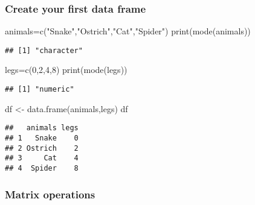 \documentclass[
]{article}
\author{}
\date{\vspace{-2.5em}}
\newenvironment{Shaded}{\begin{snugshade}}{\end{snugshade}}
\newcommand{\DecValTok}[1]{\textcolor[rgb]{0.00,0.00,0.81}{#1}}
\newcommand{\FunctionTok}[1]{\textcolor[rgb]{0.00,0.00,0.00}{#1}}
\newcommand{\NormalTok}[1]{#1}
\newcommand{\OtherTok}[1]{\textcolor[rgb]{0.56,0.35,0.01}{#1}}
\newcommand{\StringTok}[1]{\textcolor[rgb]{0.31,0.60,0.02}{#1}}
\begin{document}
\hypertarget{create-your-first-data-frame}{%
\subsubsection{Create your first data
frame}\label{create-your-first-data-frame}}

\begin{Shaded}
\begin{Highlighting}[]
\NormalTok{animals}\OtherTok{=}\FunctionTok{c}\NormalTok{(}\StringTok{"Snake"}\NormalTok{,}\StringTok{"Ostrich"}\NormalTok{,}\StringTok{"Cat"}\NormalTok{,}\StringTok{"Spider"}\NormalTok{)}
\FunctionTok{print}\NormalTok{(}\FunctionTok{mode}\NormalTok{(animals))}
\end{Highlighting}
\end{Shaded}

\begin{verbatim}
## [1] "character"
\end{verbatim}

\begin{Shaded}
\begin{Highlighting}[]
\NormalTok{legs}\OtherTok{=}\FunctionTok{c}\NormalTok{(}\DecValTok{0}\NormalTok{,}\DecValTok{2}\NormalTok{,}\DecValTok{4}\NormalTok{,}\DecValTok{8}\NormalTok{)}
\FunctionTok{print}\NormalTok{(}\FunctionTok{mode}\NormalTok{(legs))}
\end{Highlighting}
\end{Shaded}

\begin{verbatim}
## [1] "numeric"
\end{verbatim}

\begin{Shaded}
\begin{Highlighting}[]
\NormalTok{df }\OtherTok{\textless{}{-}} \FunctionTok{data.frame}\NormalTok{(animals,legs)}
\NormalTok{df}
\end{Highlighting}
\end{Shaded}

\begin{verbatim}
##   animals legs
## 1   Snake    0
## 2 Ostrich    2
## 3     Cat    4
## 4  Spider    8
\end{verbatim}

\hypertarget{matrix-operations}{%
\subsubsection{Matrix operations}\label{matrix-operations}}
\end{document}
